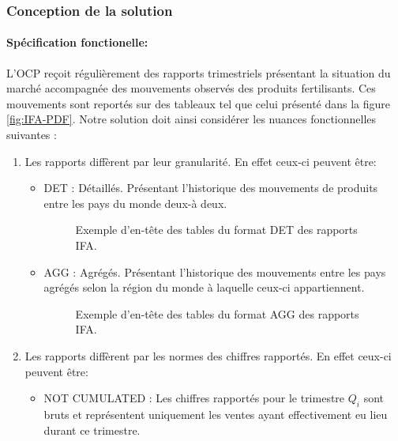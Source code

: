	\subsubsection{Conception de la solution}
	\paragraph{Spécification fonctionelle:\\}
	L'OCP reçoit régulièrement des rapports trimestriels présentant la situation du marché accompagnée des mouvements observés des produits fertilisants. Ces mouvements sont reportés sur des tableaux tel que celui présenté dans la figure \ref{fig:IFA-PDF}. Notre solution doit ainsi considérer les nuances fonctionnelles suivantes :
	\begin{enumerate}
	\item Les rapports diffèrent par leur granularité. En effet ceux-ci peuvent être:
		\begin{itemize}
		\item DET : Détaillés. Présentant l'historique des mouvements de produits entre les pays du monde deux-à deux.
		\begin{figure}[h]
					    		\centering
					    		\caption{Exemple d'en-tête des tables du format DET des rapports IFA.}
					    		\label{fig:CART}
				\end{figure}
		\item AGG : Agrégés. Présentant l'historique des mouvements entre les pays agrégés selon la région du monde à laquelle ceux-ci appartiennent.
		\begin{figure}[h]
			    		\centering
			    		\caption{Exemple d'en-tête des tables du format  AGG des rapports IFA.}
			    		\label{fig:CART}
		\end{figure}
		\end{itemize}
	\item Les rapports diffèrent par les normes des chiffres rapportés. En effet ceux-ci peuvent être:
		\begin{itemize}
		\item NOT CUMULATED : Les chiffres rapportés pour le trimestre ${Q_i}$ sont bruts et représentent uniquement les ventes ayant effectivement eu lieu durant ce trimestre.

\end{itemize}
\end{enumerate}
